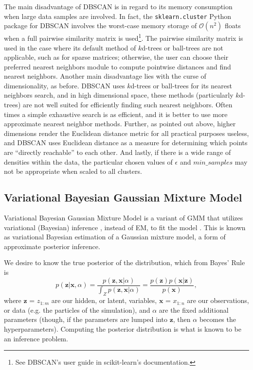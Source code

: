 \documentclass[fleqn,usenatbib,useAMS]{mnras}
\begin{document}
The main disadvantage of DBSCAN is in regard to its memory consumption when large data samples are involved. In fact, the \texttt{sklearn.cluster} Python package for DBSCAN involves the worst-case memory storage of $\mathcal{O}(n^2)$ floats when a full pairwise similarity matrix is used\footnote{See DBSCAN's user guide in scikit-learn's documentation.}. The pairwise similarity matrix is used in the case where its default method of $k$d-trees or ball-trees are not applicable, such as for sparse matrices; otherwise, the user can choose their preferred nearest neighbors module to compute pointwise distances and find nearest neighbors. Another main disadvantage lies with the curse of dimensionality, as before. DBSCAN uses $k$d-trees or ball-trees for its nearest neighbors search, and in high dimensional space, these methods (particularly $k$d-trees) are not well suited for efficiently finding such nearest neighbors. Often times a simple exhaustive search is as efficient, and it is better to use more approximate nearest neighbor methods. Further, as pointed out above, higher dimensions render the Euclidean distance metric for all practical purposes useless, and DBSCAN uses Euclidean distance as a measure for determining which points are ``directly reachable'' to each other. And lastly, if there is a wide range of densities within the data, the particular chosen values of $\epsilon$ and $min\_samples$ may not be appropriate when scaled to all clusters. 

\subsection{Variational Bayesian Gaussian Mixture Model}

Variational Bayesian Gaussian Mixture Model is a variant of GMM that utilizes variational (Bayesian) inference \citep{Jordan99, Wainwright08}, instead of EM, to fit the model \citep{Attias00}. This is known as variational Bayesian estimation of a Gaussian mixture model, a form of approximate posterior inference. \par

We desire to know the true posterior of the distribution, which from Bayes' Rule is  
%
\begin{equation}
    p(\textbf{z}|\textbf{x},\alpha) = \frac{p(\textbf{z},\textbf{x}|\alpha)}{\int_Z p(\textbf{z},\textbf{x}|\alpha)} = \frac{p(\textbf{z})p(\textbf{x}|\textbf{z})}{p(\textbf{x})},
    \label{eq:BayesRule}
\end{equation}
%
where $\textbf{z}$ = $z_{1:m}$ are our hidden, or latent, variables, $\textbf{x}$ = $x_{1:n}$ are our observations, or data (e.g. the particles of the simulation), and $\alpha$ are the fixed additional parameters (though, if the parameters are lumped into $\textbf{z}$, then $\alpha$ becomes the hyperparameters). Computing the posterior distribution is what is known to be an inference problem. \par
\end{document}
